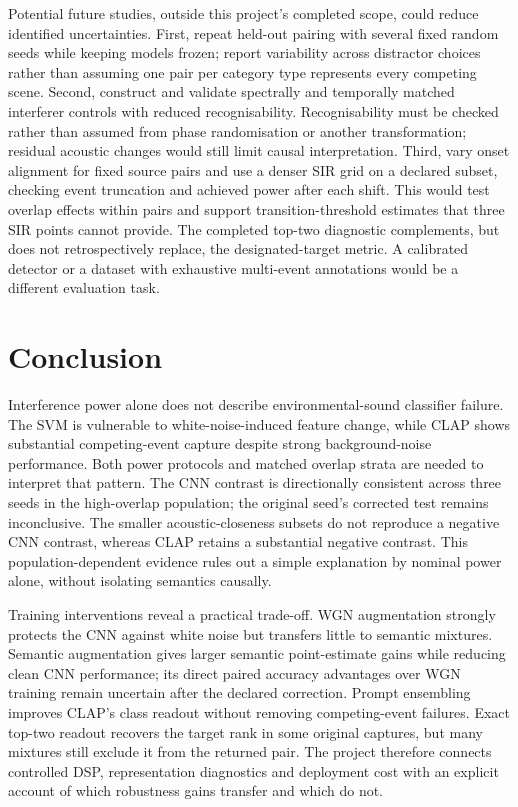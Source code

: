\documentclass[a4paper,10pt]{article}
\begin{document}
Potential future studies, outside this project's completed scope, could reduce
identified uncertainties. First,
repeat held-out pairing with several fixed random seeds while keeping models
frozen; report variability across distractor choices rather than assuming one
pair per category type represents every competing scene. Second, construct and
validate spectrally and temporally matched interferer controls with reduced
recognisability. Recognisability must be checked rather than assumed from phase
randomisation or another transformation; residual acoustic changes would still
limit causal interpretation. Third, vary onset alignment for fixed source pairs
and use a denser SIR grid on a declared subset, checking event truncation and
achieved power after each shift. This would test overlap effects within pairs
and support transition-threshold estimates that three SIR points cannot provide.
The completed top-two diagnostic complements, but does not retrospectively
replace, the designated-target metric. A calibrated detector or a dataset with
exhaustive multi-event annotations would be a different evaluation task.

\section{Conclusion}
Interference power alone does not describe environmental-sound classifier
failure. The SVM is vulnerable to white-noise-induced feature change, while
CLAP shows substantial competing-event capture despite strong background-noise
performance. Both power protocols and matched overlap strata are needed to
interpret that pattern. The CNN contrast is directionally consistent across
three seeds in the high-overlap population; the original seed's corrected test
remains inconclusive. The smaller acoustic-closeness subsets do not reproduce
a negative CNN contrast, whereas CLAP retains a substantial negative contrast.
This population-dependent evidence rules out a simple explanation by nominal
power alone, without isolating semantics causally.

Training interventions reveal a practical trade-off. WGN augmentation strongly
protects the CNN against white noise but transfers little to semantic mixtures.
Semantic augmentation gives larger semantic point-estimate gains while reducing
clean CNN performance; its direct paired accuracy advantages over WGN training
remain uncertain after the declared correction. Prompt ensembling improves
CLAP's class readout without removing competing-event failures. Exact top-two
readout recovers the target rank in some original captures, but many mixtures
still exclude it from the returned pair. The project
therefore connects controlled DSP, representation diagnostics and deployment
cost with an explicit account of which robustness gains transfer and which do not.
\end{document}

